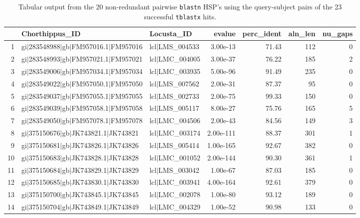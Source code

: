\documentclass{article}\usepackage[]{graphicx}\usepackage[]{color}
\begin{document}


\begin{table}[ht]
\centering
\caption{Tabular output from the 20 non-redundant pairwise \texttt{blastn} HSP's using the query-subject pairs of the 23 successful \texttt{tblastx} hits.} 
\label{pident}
\begin{tabular}{rllrrrr}
  \hline
 & Chorthippus\_ID & Locusta\_ID & evalue & perc\_ident & aln\_len & nu\_gaps \\ 
  \hline
1 & gi$|$283548988$|$gb$|$FM957016.1$|$FM957016 & lcl$|$LMS\_004533 & 3.00e-13 & 71.43 & 112 &   0 \\ 
  2 & gi$|$283548993$|$gb$|$FM957021.1$|$FM957021 & lcl$|$LMC\_004005 & 3.00e-37 & 76.22 & 185 &   2 \\ 
  3 & gi$|$283549006$|$gb$|$FM957034.1$|$FM957034 & lcl$|$LMC\_003935 & 5.00e-96 & 91.49 & 235 &   0 \\ 
  4 & gi$|$283549022$|$gb$|$FM957050.1$|$FM957050 & lcl$|$LMS\_007562 & 2.00e-31 & 87.37 &  95 &   0 \\ 
  5 & gi$|$283549037$|$gb$|$FM957055.1$|$FM957055 & lcl$|$LMS\_002733 & 2.00e-75 & 99.33 & 150 &   0 \\ 
  6 & gi$|$283549039$|$gb$|$FM957058.1$|$FM957058 & lcl$|$LMS\_005117 & 8.00e-27 & 75.76 & 165 &   5 \\ 
  7 & gi$|$283549050$|$gb$|$FM957078.1$|$FM957078 & lcl$|$LMC\_004506 & 2.00e-43 & 84.56 & 149 &   3 \\ 
  8 & gi$|$375150676$|$gb$|$JK743821.1$|$JK743821 & lcl$|$LMC\_003174 & 2.00e-111 & 88.37 & 301 &   1 \\ 
  9 & gi$|$375150681$|$gb$|$JK743826.1$|$JK743826 & lcl$|$LMS\_005414 & 1.00e-165 & 92.67 & 382 &   0 \\ 
  10 & gi$|$375150683$|$gb$|$JK743828.1$|$JK743828 & lcl$|$LMC\_001052 & 2.00e-144 & 90.30 & 361 &   1 \\ 
  11 & gi$|$375150684$|$gb$|$JK743829.1$|$JK743829 & lcl$|$LMS\_003042 & 1.00e-67 & 87.03 & 185 &   0 \\ 
  12 & gi$|$375150685$|$gb$|$JK743830.1$|$JK743830 & lcl$|$LMC\_003941 & 4.00e-164 & 92.61 & 379 &   0 \\ 
  13 & gi$|$375150700$|$gb$|$JK743845.1$|$JK743845 & lcl$|$LMC\_002078 & 1.00e-80 & 93.12 & 189 &   0 \\ 
  14 & gi$|$375150704$|$gb$|$JK743849.1$|$JK743849 & lcl$|$LMC\_004329 & 1.00e-52 & 90.98 & 133 &   0 \\ 

\end{tabular}
\end{table}
\end{document}
